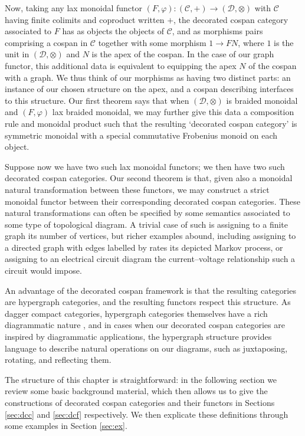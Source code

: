 Now, taking any lax monoidal functor $(F,\varphi)\colon  (\mathcal C,+) \to (\mathcal
D,\otimes)$ with $\mathcal C$ having finite colimits and coproduct written $+$,
the decorated cospan category associated to $F$ has as objects the objects of
$\mathcal C$, and as morphisms pairs comprising a cospan in $\mathcal C$
together with some morphism $1 \to FN$, where $1$ is the unit in $(\mathcal
D,\otimes)$ and $N$ is the apex of the cospan. In the case of our graph
functor, this additional data is equivalent to equipping the apex $N$ of the
cospan with a graph. We thus think of our morphisms as having two distinct
parts: an instance of our chosen structure on the apex, and a cospan describing
interfaces to this structure. Our first theorem says that when $(\mathcal
D,\otimes)$ is braided monoidal and $(F,\varphi)$ lax braided monoidal, we may
further give this data a composition rule and monoidal product such that the
resulting `decorated cospan category' is symmetric monoidal with a special
commutative Frobenius monoid on each object.  

Suppose now we have two such lax monoidal functors; we then have two such
decorated cospan categories. Our second theorem is that, given also a monoidal
natural transformation between these functors, we may construct a strict
monoidal functor between their corresponding decorated cospan categories.  These
natural transformations can often be specified by some semantics associated to
some type of topological diagram. A trivial case of such is assigning to a
finite graph its number of vertices, but richer examples abound, including
assigning to a directed graph with edges labelled by rates its depicted Markov
process, or assigning to an electrical circuit diagram the current--voltage
relationship such a circuit would impose.

An advantage of the decorated cospan framework is that the resulting categories
are hypergraph categories, and the resulting functors respect this structure.
As dagger compact categories, hypergraph categories themselves have a rich
diagrammatic nature \cite{Se}, and in cases when our decorated cospan categories
are inspired by diagrammatic applications, the hypergraph structure provides
language to describe natural operations on our diagrams, such as juxtaposing,
rotating, and reflecting them.

The structure of this chapter is straightforward: in the following section we
review some basic background material, which then allows us to give the
constructions of decorated cospan categories and their functors in Sections
\ref{sec:dcc} and \ref{sec:dcf} respectively. We then explicate these
definitions through some examples in Section \ref{sec:ex}. 

